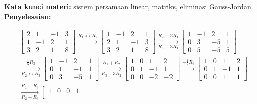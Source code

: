 \documentclass[10pt,openany,a4paper]{article}
\theoremstyle{definition}
\theoremstyle{definition}
\theoremstyle{plain}
\newenvironment{jawab}[2][tes]{%
\par\noindent\textbf{Kata kunci materi:} #1.\\
\textbf{Penyelesaian:} #2%
}{}
\begin{document}
\begin{enumerate}
\begin{jawab}[sistem persamaan linear, matriks, eliminasi Gauss-Jordan]
{\begin{enumerate}
\begin{align*}
                &\left[\begin{array}{ccc|c}
                    2 & 1 & -1 & 3\\
                    1 & -1 & 2 & 1\\
                    3 & 2 & 1 & 8
                \end{array}\right]
                \xrightarrow{R_1 \leftrightarrow R_2}
                \left[\begin{array}{ccc|c}
                    1 & -1 & 2 & 1\\
                    2 & 1 & -1 & 3\\
                    3 & 2 & 1 & 8
                \end{array}\right]
                \xrightarrow[R_3 - 3R_1]{R_2 - 2R_1}
                \left[\begin{array}{ccc|c}
                    1 & -1 & 2 & 1\\
                    0 & 3 & -5 & 1\\
                    0 & 5 & -5 & 5
                \end{array}\right]\\
                &\xrightarrow[R_2 \leftrightarrow R_3]{\frac{1}{5}R_3}
                \left[\begin{array}{ccc|c}
                    1 & -1 & 2 & 1\\
                    0 & 1 & -1 & 1\\
                    0 & 3 & -5 & 1
                \end{array}\right]
                \xrightarrow[R_3 - 3R_2]{R_1 + R_2}
                \left[\begin{array}{ccc|c}
                    1 & 0 & 1 & 2\\
                    0 & 1 & -1 & 1\\
                    0 & 0 & -2 & -2
                \end{array}\right]
                \xrightarrow{-\frac{1}{2}R_3}
                \left[\begin{array}{ccc|c}
                    1 & 0 & 1 & 2\\
                    0 & 1 & -1 & 1\\
                    0 & 0 & 1 & 1
                \end{array}\right]\\
                &\xrightarrow[R_2 + R_3]{R_1 - R_3}
                \left[\begin{array}{ccc|c}
                    1 & 0 & 0 & 1\\

\end{array}
\end{align*}
\end{enumerate}}
\end{jawab}
\end{enumerate}
\end{document}
